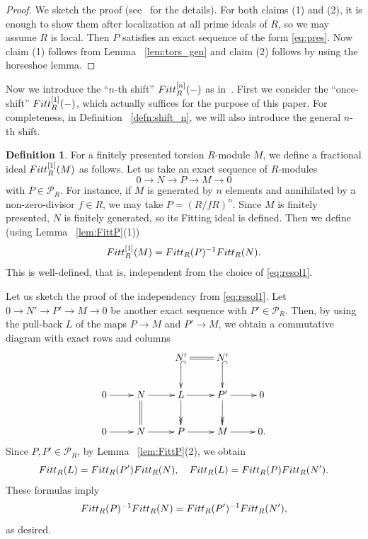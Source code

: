 \documentclass[11pt]{article}
\theoremstyle{definition}
\newtheorem{defi}[theo]{Definition}
\numberwithin{equation}{section}
\newcommand{\cP}{\mathcal{P}}
\newcommand{\Fitt}{{\rm Fitt}}
\begin{document}
\begin{proof}
We sketch the proof (see~\cite[Proposition 2.7]{Kata_05} for the details).
For both claims (1) and (2), it is enough to show them after localization at all prime ideals of $R$, so we may assume $R$ is local.
Then $P$ satisfies an exact sequence of the form \eqref{eq:pres}.
Now claim (1) follows from Lemma ~\ref{lem:tors_gen} and claim (2) follows by using the horseshoe lemma.
\end{proof}

Now we introduce the ``$n$-th shift'' $\Fitt^{[n]}_R(-)$ as in~\cite[Theorem 2.6]{Kata_05}.
First we consider the ``once-shift'' $\Fitt^{[1]}_R(-)$, which actually suffices for the purpose of this paper.
For completeness, in Definition ~\ref{defn:shift_n}, we will also introduce the general $n$-th shift.

\begin{defi}
For a finitely presented torsion $R$-module $M$, we define a fractional ideal $\Fitt^{[1]}_R(M)$ as follows.
Let us take an exact sequence of $R$-modules
\begin{equation}\label{eq:resol1}
0 \to N \to P \to M \to 0
\end{equation}
with $P \in \cP_R$.
For instance, if $M$ is generated by $n$ elements and annihilated by a non-zero-divisor $f \in R$, we may take $P = (R/fR)^n$.
Since $M$ is finitely presented, $N$ is finitely generated, so its Fitting ideal is defined.
Then we define (using Lemma ~\ref{lem:FittP}(1))
\[
\Fitt^{[1]}_R(M) = \Fitt_R(P)^{-1} \Fitt_R(N).
\]
This is well-defined, that is, independent from the choice of \eqref{eq:resol1}.
\end{defi}

Let us sketch the proof of the independency from \eqref{eq:resol1}.
Let $0 \to N' \to P' \to M \to 0$ be another exact sequence with $P' \in \cP_R$.
Then, by using the pull-back $L$ of the maps $P \to M$ and $P' \to M$, we obtain a commutative diagram with exact rows and columns
\[
\xymatrix{
	& & N' \ar@{=}[r] \ar@{^(->}[d]
	& N' \ar@{^(->}[d]
	& \\
	0 \ar[r]
	& N \ar[r] \ar@{=}[d]
	& L \ar[r] \ar@{->>}[d]
	& P' \ar[r] \ar@{->>}[d]
	& 0\\
	0 \ar[r]
	& N \ar[r]
	& P \ar[r]
	& M \ar[r]
	& 0.
}
\]
Since $P, P' \in \cP_R$, by Lemma ~\ref{lem:FittP}(2), we obtain
\[
\Fitt_R(L) = \Fitt_R(P') \Fitt_R(N),
\quad
\Fitt_R(L) = \Fitt_R(P) \Fitt_R(N').
\]
These formulas imply 
\[
\Fitt_R(P)^{-1} \Fitt_R(N)
= \Fitt_R(P')^{-1} \Fitt_R(N'),
\]
as desired.
\end{document}
